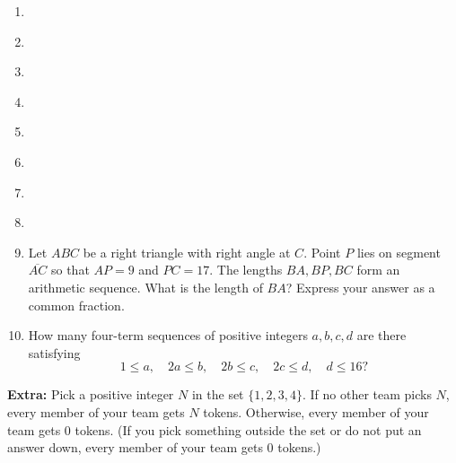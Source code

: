 \documentclass{article}
\begin{document}
\begin{enumerate}
\item \underline{\hspace{3in}}\vspace{1cm}
\item \underline{\hspace{3in}}\vspace{1cm}
\item \underline{\hspace{3in}}\vspace{1cm}
\item \underline{\hspace{3in}}\vspace{1cm}
\item \underline{\hspace{3in}}\vspace{1cm}
\item \underline{\hspace{3in}}\vspace{1cm}
\item \underline{\hspace{3in}}\vspace{1cm}
\item \underline{\hspace{3in}}\vspace{1cm}
\item Let $ABC$ be a right triangle with right angle at $C$. Point $P$ lies on segment $\overline{AC}$ so that $AP = 9$ and $PC = 17$. The lengths $BA, BP, BC$ form an arithmetic sequence. What is the length of $BA$? Express your answer as a common fraction.\vspace{1cm}
\item How many four-term sequences of positive integers $a, b, c, d$ are there satisfying
\begin{equation*}
1\leq a,\quad 2a\leq b,\quad 2b\leq c,\quad 2c\leq d,\quad d\leq 16?
\end{equation*}
\end{enumerate}\vspace{1cm}

\textbf{Extra:} Pick a positive integer $N$ in the set $\{1, 2, 3, 4\}$. If no other team picks $N$, every member of your team gets $N$ tokens. Otherwise, every member of your team gets $0$ tokens. (If you pick something outside the set or do not put an answer down, every member of your team gets $0$ tokens.)
\end{document}
